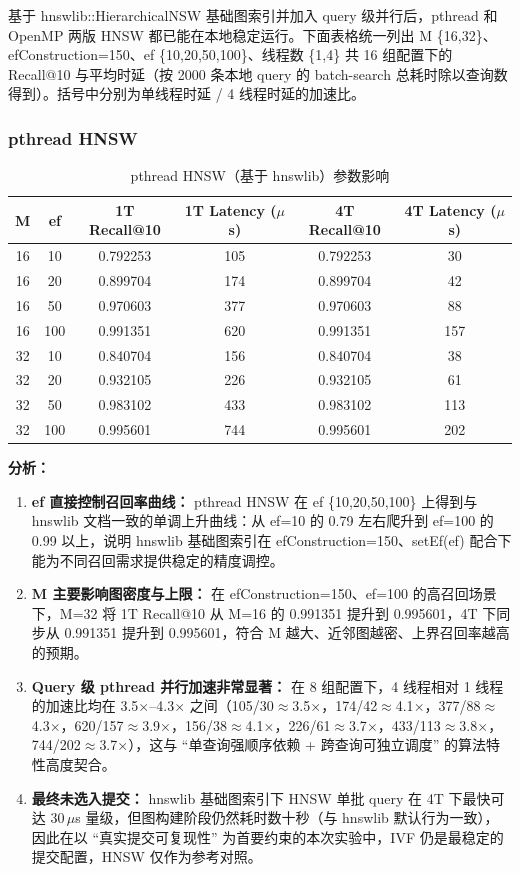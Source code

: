 \documentclass[a4paper]{article}
\begin{document}
基于 hnswlib::HierarchicalNSW 基础图索引并加入 query 级并行后，pthread 和 OpenMP 两版 HNSW 都已能在本地稳定运行。下面表格统一列出 M \in \{16,32\}、efConstruction=150、ef \in \{10,20,50,100\}、线程数 \in \{1,4\} 共 16 组配置下的 Recall@10 与平均时延（按 2000 条本地 query 的 batch-search 总耗时除以查询数得到）。括号中分别为单线程时延 / 4 线程时延的加速比。

\subsubsection{pthread HNSW}

\begin{table}[htbp]
\centering
\caption{pthread HNSW（基于 hnswlib）参数影响}
\begin{tabular}{cccccc}
\toprule
M & ef & 1T Recall@10 & 1T Latency ($\mu$s) & 4T Recall@10 & 4T Latency ($\mu$s) \\
\midrule
16 & 10  & 0.792253 & 105  & 0.792253 & 30  \\
16 & 20  & 0.899704 & 174  & 0.899704 & 42  \\
16 & 50  & 0.970603 & 377  & 0.970603 & 88  \\
16 & 100 & 0.991351 & 620  & 0.991351 & 157 \\
32 & 10  & 0.840704 & 156  & 0.840704 & 38  \\
32 & 20  & 0.932105 & 226  & 0.932105 & 61  \\
32 & 50  & 0.983102 & 433  & 0.983102 & 113 \\
32 & 100 & 0.995601 & 744  & 0.995601 & 202 \\
\bottomrule
\end{tabular}
\end{table}

\textbf{分析：}
\begin{enumerate}
\item \textbf{ef 直接控制召回率曲线：} pthread HNSW 在 ef \in \{10,20,50,100\} 上得到与 hnswlib 文档一致的单调上升曲线：从 ef=10 的 0.79 左右爬升到 ef=100 的 0.99 以上，说明 hnswlib 基础图索引在 efConstruction=150、setEf(ef) 配合下能为不同召回需求提供稳定的精度调控。
\item \textbf{M 主要影响图密度与上限：} 在 efConstruction=150、ef=100 的高召回场景下，M=32 将 1T Recall@10 从 M=16 的 0.991351 提升到 0.995601，4T 下同步从 0.991351 提升到 0.995601，符合 M 越大、近邻图越密、上界召回率越高的预期。
\item \textbf{Query 级 pthread 并行加速非常显著：} 在 8 组配置下，4 线程相对 1 线程的加速比均在 3.5$\times$--4.3$\times$ 之间（105/30$\approx$3.5$\times$，174/42$\approx$4.1$\times$，377/88$\approx$4.3$\times$，620/157$\approx$3.9$\times$，156/38$\approx$4.1$\times$，226/61$\approx$3.7$\times$，433/113$\approx$3.8$\times$，744/202$\approx$3.7$\times$），这与 ``单查询强顺序依赖 + 跨查询可独立调度'' 的算法特性高度契合。
\item \textbf{最终未选入提交：} hnswlib 基础图索引下 HNSW 单批 query 在 4T 下最快可达 30\,$\mu$s 量级，但图构建阶段仍然耗时数十秒（与 hnswlib 默认行为一致），因此在以 ``真实提交可复现性'' 为首要约束的本次实验中，IVF 仍是最稳定的提交配置，HNSW 仅作为参考对照。
\end{enumerate}
\end{document}
